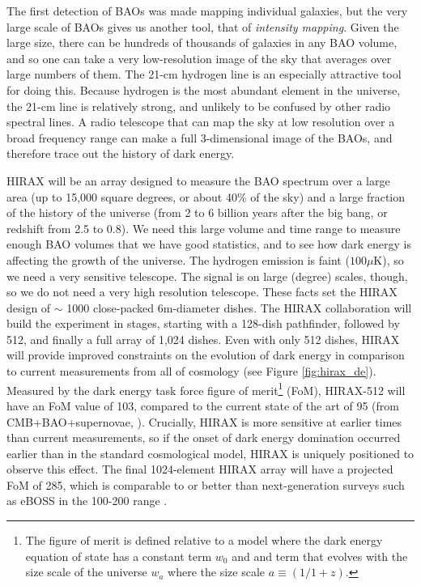 \documentclass[letterpaper,11pt,preprint]{aastex}
\begin{document}
The first detection of BAOs \citep{Eisenstein05} was made mapping
individual galaxies, but the very large scale of BAOs gives us another
tool, that of {\textit{intensity mapping}}.  Given the large size,
there can be hundreds of thousands of galaxies in any BAO volume, and
so one can take a very low-resolution image of the sky that averages
over large numbers of them.  The 21-cm hydrogen line is an especially
attractive tool for doing this.  Because hydrogen is the most abundant
element in the universe, the 21-cm line is relatively strong, and
unlikely to be confused by other radio spectral lines.  A radio
telescope that can map the sky at low resolution over a broad
frequency range can make a full 3-dimensional image of the BAOs, and
therefore trace out the history of dark energy.

HIRAX will be an array designed to measure the BAO spectrum over a
large area (up to 15,000 square degrees, or about 40\% of the sky) and
a large fraction of the history of the universe (from 2 to 6 billion
years after the big bang, or redshift from 2.5 to 0.8).  We need this
large volume and time range to measure enough BAO volumes that we have
good statistics, and to see how dark energy is affecting the growth of
the universe.  The hydrogen emission is faint ($100 \mu \mathrm{K}$),
so we need a very sensitive telescope.  The signal is on large
(degree) scales, though, so we do not need a very high resolution
telescope.  These facts set the HIRAX design of $\sim$ 1000
close-packed 6m-diameter dishes.  The HIRAX collaboration will build
the experiment in stages, starting with a 128-dish pathfinder,
followed by 512, and finally a full array of 1,024 dishes.  Even with
only 512 dishes, HIRAX will provide improved constraints on the
evolution of dark energy in comparison to current measurements from
all of cosmology (see Figure \ref{fig:hirax_de}).  Measured by the
dark energy task force figure of merit\footnote{The figure of merit is
  defined relative to a model where the dark energy equation of state
  has a constant term $w_0$ and and term that evolves with the size
  scale of the universe $w_a$ where the size scale $a\equiv(1/1+z)$.}
(FoM), HIRAX-512 will have an FoM value of 103, compared to the
current state of the art of 95 (from CMB+BAO+supernovae,
\citet{Planck2018Params}).  Crucially, HIRAX is more sensitive at
earlier times than current measurements, so if the onset of dark
energy domination occurred earlier than in the standard cosmological
model, HIRAX is uniquely positioned to observe this effect.  The final
1024-element HIRAX array will have a projected FoM of 285, which is
comparable to or better than next-generation surveys such as eBOSS in
the 100-200 range \citep{Zhao2016}.
\end{document}
